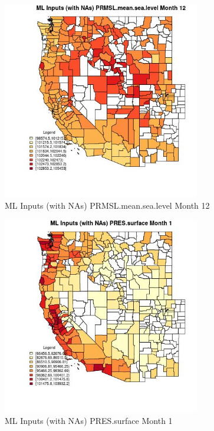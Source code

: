 \begin{figure} 
\centering  
\includegraphics[width=0.77\textwidth]{Code_Outputs/Report_ML_input_PM25_Step4_part_f_de_duplicated_aveswNAs_CountyPRMSLmeansealevelmedianMonth12.jpg} 
\caption{\label{fig:Report_ML_input_PM25_Step4_part_f_de_duplicated_aveswNAsCountyPRMSLmeansealevelmedianMonth12}ML Inputs (with NAs) PRMSL.mean.sea.level Month 12} 
\end{figure} 
 

\begin{figure} 
\centering  
\includegraphics[width=0.77\textwidth]{Code_Outputs/Report_ML_input_PM25_Step4_part_f_de_duplicated_aveswNAs_CountyPRESsurfacemedianMonth1.jpg} 
\caption{\label{fig:Report_ML_input_PM25_Step4_part_f_de_duplicated_aveswNAsCountyPRESsurfacemedianMonth1}ML Inputs (with NAs) PRES.surface Month 1} 
\end{figure} 
 

